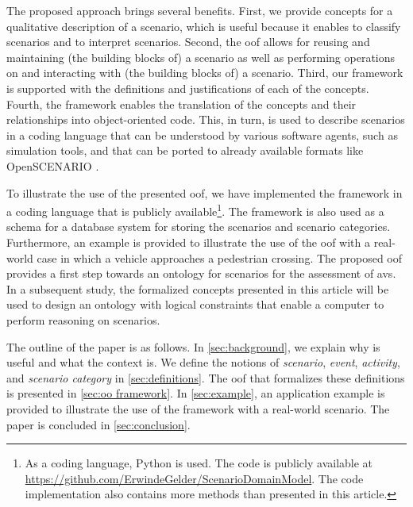 The proposed approach brings several benefits.
First, we provide concepts for a qualitative description of a scenario, which is useful because it enables to classify scenarios and to interpret scenarios. 
Second, the \ac{oof} allows for reusing and maintaining (the building blocks of) a scenario as well as performing operations on and interacting with (the building blocks of) a scenario.
Third, our framework is supported with the definitions and justifications of each of the \cendc\cstartd concepts\cendd\cstartc.
Fourth, the framework enables the translation of the \cendc\cstartd concepts and their relationships \cendd\cstartc into object-oriented code.
This, in turn, is used to describe scenarios in a coding language that can be understood by various software agents, such as simulation tools\cendc\cstartd, and that can be ported to already available formats like OpenSCENARIO \cite{openscenario}. \cendd

\cstartc To illustrate the use of the presented \ac{oof}, we have implemented the framework in a coding language that is publicly available\footnote{As a coding language, Python is used. The code is publicly available at \url{https://github.com/ErwindeGelder/ScenarioDomainModel}. \cstarte The code implementation also contains more methods than presented in this article.\cende}.
The framework is also used as a schema for a database system for storing the scenarios and scenario categories.
Furthermore, an example is provided to illustrate the use of the \ac{oof} with a real-world case \cendc\cstartf in which a vehicle approaches a pedestrian crossing\cendf\cstartc.
The proposed \ac{oof} provides a first step towards an ontology \autocite{siricharoen2009ontology} for scenarios for the assessment of \acp{av}. In a subsequent study, the formalized concepts presented in this article \cendc\cstartf will be \cendf\cstartc used to design an ontology with logical constraints that enable a computer to perform reasoning on scenarios.
\cendc

The outline of the paper is as follows. In \cref{sec:background}, we explain why \cstartb {} \cendb is useful and what the context is. 
We define the notions of \emph{scenario}, \emph{event}, \emph{activity}, and \emph{scenario category}  in \cref{sec:definitions}. 
The \cstartb \ac{oof} \cendb that formalizes these definitions is presented in \cref{sec:oo framework}. 
In \cref{sec:example}, an application example is provided to illustrate the use of the \cstartb framework \cendb with a real-world scenario. 
The paper is concluded in \cref{sec:conclusion}.
